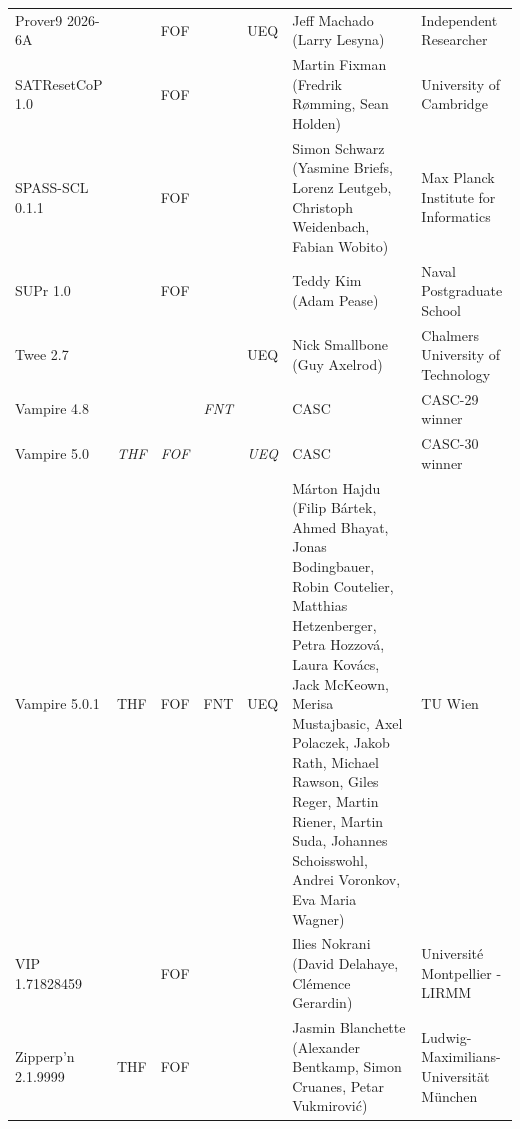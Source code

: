\documentclass[aic]{iosart2x}
\newcommand{\LAST}{\mbox{CASC-30}}
\begin{document}
\begin{table}
\begin{tabular}{lp{1.5em}p{1.5em}p{1.5em}p{1.5em}>{\raggedright\arraybackslash}p{4.4cm}>{\raggedright\arraybackslash}p{3.4cm}}
Prover9 2026-6A           &   &FOF&   &UEQ& Jeff Machado (Larry Lesyna)                       & Independent Researcher \\
SATResetCoP 1.0           &   &FOF&   &   & Martin Fixman (Fredrik Rømming, Sean Holden)      & University of Cambridge \\
SPASS-SCL 0.1.1           &   &FOF&   &   & Simon Schwarz (Yasmine Briefs, Lorenz Leutgeb, Christoph Weidenbach, Fabian Wobito)
                                                                                              & Max Planck Institute for Informatics \\
SUPr 1.0                  &   &FOF&   &   & Teddy Kim (Adam Pease)                            & Naval Postgraduate School \\
Twee 2.7                  &   &   &   &UEQ& Nick Smallbone (Guy Axelrod)                      & Chalmers University of Technology \\
Vampire 4.8               &   &   &{\em FNT}&   & CASC                                        & CASC-29 winner \\
Vampire 5.0               &{\em THF}&{\em FOF}&   &{\em UEQ}& CASC                            & \LAST{} winner \\
Vampire 5.0.1             &THF&FOF&FNT&UEQ& Márton Hajdu (Filip Bártek, Ahmed Bhayat, Jonas Bodingbauer, Robin Coutelier, 
                                                Matthias Hetzenberger, Petra Hozzová, Laura Kovács, Jack McKeown, Merisa Mustajbasic, 
                                                Axel Polaczek, Jakob Rath, Michael Rawson, Giles Reger, Martin Riener, Martin Suda, 
                                                Johannes Schoisswohl, Andrei Voronkov, 
                                                Eva Maria Wagner)                                 & TU Wien \\
VIP 1.71828459        &   &FOF&   &   & Ilies Nokrani (David Delahaye, Clémence Gerardin) & Université Montpellier - LIRMM \\
Zipperp'n 2.1.9999        &THF&FOF&   &   & Jasmin Blanchette
                          (Alexander Bentkamp, Simon Cruanes, Petar Vukmirovi{\'c})               & Ludwig-Maximilians-Universität München\\
\hline
\end{tabular}
\end{table}

\end{document}
